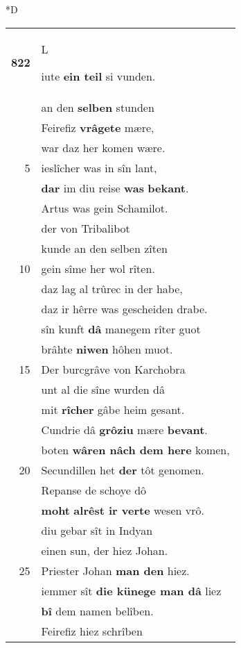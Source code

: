 \documentclass[8pt,a4paper,notitlepage]{article}
\begin{document}
\begin{table}[ht]
\begin{minipage}[t]{0.5\linewidth}
\small
\begin{center}*D
\end{center}
\begin{tabular}{rl}
\textbf{822} & \begin{large}L\end{large}iute \textbf{ein teil} si vunden.\\ 
 & an den \textbf{selben} stunden\\ 
 & Feirefiz \textbf{vrâgete} mære,\\ 
 & war daz her komen wære.\\ 
5 & ieslîcher was in sîn lant,\\ 
 & \textbf{dar} im diu reise \textbf{was} \textbf{bekant}.\\ 
 & Artus was gein Schamilot.\\ 
 & der von Tribalibot\\ 
 & kunde an den selben zîten\\ 
10 & gein sîme her wol rîten.\\ 
 & daz lag al trûrec in der habe,\\ 
 & daz ir hêrre was gescheiden drabe.\\ 
 & sîn kunft \textbf{dâ} manegem rîter guot\\ 
 & brâhte \textbf{niwen} hôhen muot.\\ 
15 & Der burcgrâve von Karchobra\\ 
 & unt al die sîne wurden dâ\\ 
 & mit \textbf{rîcher} gâbe heim gesant.\\ 
 & Cundrie dâ \textbf{grôziu} mære \textbf{bevant}.\\ 
 & boten \textbf{wâren nâch dem here} komen,\\ 
20 & Secundillen het \textbf{der} tôt genomen.\\ 
 & Repanse de schoye dô\\ 
 & \textbf{moht} \textbf{alrêst ir verte} wesen vrô.\\ 
 & diu gebar sît in Indyan\\ 
 & einen sun, der hiez Johan.\\ 
25 & Priester Johan \textbf{man den} hiez.\\ 
 & iemmer sît \textbf{die künege man dâ} liez\\ 
 & \textbf{bî} dem namen belîben.\\ 
 & Feirefiz hiez schrîben\\ 

\end{tabular}
\end{minipage}
\end{table}
\end{document}
